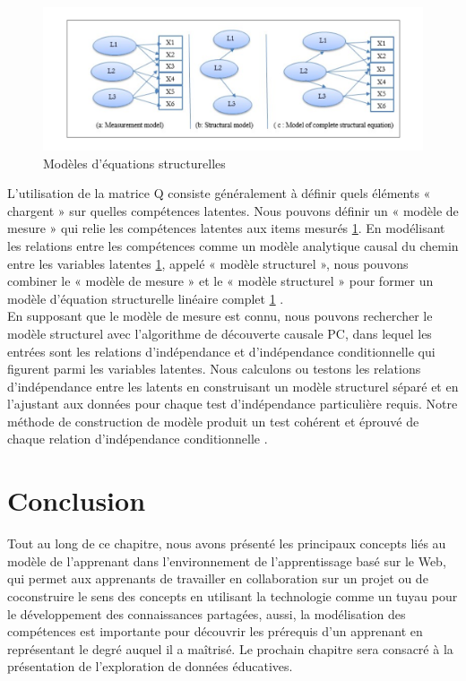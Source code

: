 \begin{figure}[H]
	\begin{center}
		\includegraphics[width=\textwidth]{images/chapitre2/Modèles d'équations structurelles.png}
	\end{center}
\caption{Modèles d'équations structurelles}
\label{modeleEquation}
\end{figure}

L'utilisation de la matrice Q consiste généralement à définir quels éléments « chargent » sur quelles compétences latentes. Nous pouvons définir un « modèle de mesure » qui relie les compétences latentes aux items mesurés \ref{modeleEquation}. En modélisant les relations entre les compétences comme un modèle analytique causal du chemin entre les variables latentes \ref{modeleEquation}, appelé « modèle structurel », nous pouvons combiner le « modèle de mesure » et le « modèle structurel » pour former un modèle d'équation structurelle linéaire complet \ref{modeleEquation} \cite{Structural_Equations_with_Latent_Variables}. \\
En supposant que le modèle de mesure est connu, nous pouvons rechercher le modèle structurel avec l'algorithme de découverte causale PC, dans lequel les entrées sont les relations d'indépendance et d'indépendance conditionnelle qui figurent parmi les variables latentes. Nous calculons ou testons les relations d'indépendance entre les latents en construisant un modèle structurel séparé et en l'ajustant aux données pour chaque test d'indépendance particulière requis. Notre méthode de construction de modèle produit un test cohérent et éprouvé de chaque relation d'indépendance conditionnelle \cite{Discovering_Prerequisite_Relationships_among_Knowledge_Components}.

\section{Conclusion}
Tout au long de ce chapitre, nous avons présenté les principaux concepts liés au modèle de l'apprenant dans l'environnement de l'apprentissage basé sur le Web, qui permet aux apprenants de travailler en collaboration sur un projet ou de coconstruire le sens des concepts en utilisant la technologie comme un tuyau pour le développement des connaissances partagées, aussi, la modélisation des compétences est importante pour découvrir les prérequis d'un apprenant en représentant le degré auquel il a maîtrisé.
Le prochain chapitre sera consacré à la présentation de l'exploration de données éducatives.








